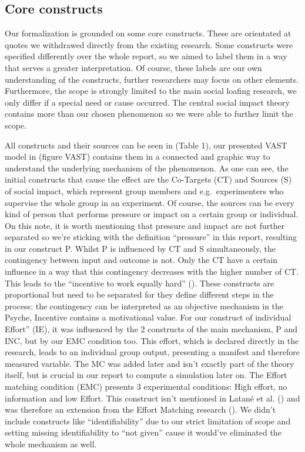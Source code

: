 \documentclass[
  man,
  longtable,
  a4paper,
  nolmodern,
  notxfonts,
  notimes,
  colorlinks=true,linkcolor=blue,citecolor=blue,urlcolor=blue]{apa7}
\begin{document}
\subsection{Core constructs}\label{core-constructs}

Our formalization is grounded on some core constructs. These are
orientated at quotes we withdrawed directly from the existing research.
Some constructs were specified differently over the whole report, so we
aimed to label them in a way that serves a greater interpretation. Of
course, these labels are our own understanding of the constructs,
further researchers may focus on other elements. Furthermore, the scope
is strongly limited to the main social loafing research, we only differ
if a special need or cause occurred. The central social impact theory
contains more than our chosen phenomenon so we were able to further
limit the scope.

All constructs and their sources can be seen in (Table 1), our presented
VAST model in (figure VAST) contains them in a connected and graphic way
to understand the underlying mechanism of the phenomenon. As one can
see, the initial constructs that cause the effect are the Co-Targets
(CT) and Sources (S) of social impact, which represent group members and
e.g.~experimenters who supervise the whole group in an experiment. Of
course, the sources can be every kind of person that performs pressure
or impact on a certain group or individual. On this note, it is worth
mentioning that pressure and impact are not further separated so we're
sticking with the definition ``pressure'' in this report, resulting in
our construct P. Whilst P is influenced by CT and S simultaneously, the
contingency between input and outcome is not. Only the CT have a certain
influence in a way that this contingency decreases with the higher
number of CT. This leads to the ``incentive to work equally hard''
(). These constructs
are proportional but need to be separated for they define different
steps in the process: the contingency can be interpreted as an objective
mechanism in the Psyche, Incentive contains a motivational value. For
our construct of individual Effort'' (IE), it was influenced by the 2
constructs of the main mechanism, P and INC, but by our EMC condition
too. This effort, which is declared directly in the research, leads to
an individual group output, presenting a manifest and therefore measured
variable. The MC was added later and isn't exactly part of the theory
itself, but is crucial in our report to compute a simulation later on.
The Effort matching condition (EMC) presents 3 experimental conditions:
High effort, no information and low Effort. This construct isn't
mentioned in Latané et al. () and was
therefore an extension from the Effort Matching research
(). We didn't
include constructs like ``identifiability'' due to our strict limitation
of scope and setting missing identifiability to ``not given'' cause it
would've eliminated the whole mechanism as well.
\end{document}
